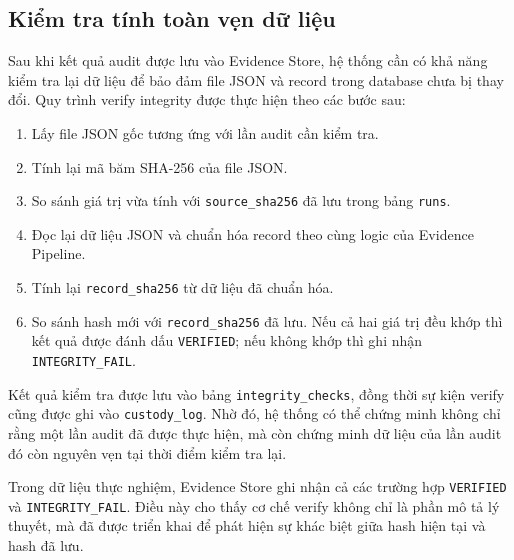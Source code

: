 \subsection{Kiểm tra tính toàn vẹn dữ liệu}\label{kiem-tra-tinh-toan-ven-du-lieu}

Sau khi kết quả audit được lưu vào Evidence Store, hệ thống cần có khả năng kiểm tra lại dữ liệu để bảo đảm file JSON và record trong database chưa bị thay đổi. Quy trình verify integrity được thực hiện theo các bước sau:

\begin{enumerate}
\item Lấy file JSON gốc tương ứng với lần audit cần kiểm tra.
\item Tính lại mã băm SHA-256 của file JSON.
\item So sánh giá trị vừa tính với \texttt{source\_sha256} đã lưu trong bảng \texttt{runs}.
\item Đọc lại dữ liệu JSON và chuẩn hóa record theo cùng logic của Evidence Pipeline.
\item Tính lại \texttt{record\_sha256} từ dữ liệu đã chuẩn hóa.
\item So sánh hash mới với \texttt{record\_sha256} đã lưu. Nếu cả hai giá trị đều khớp thì kết quả được đánh dấu \texttt{VERIFIED}; nếu không khớp thì ghi nhận \texttt{INTEGRITY\_FAIL}.
\end{enumerate}

Kết quả kiểm tra được lưu vào bảng \texttt{integrity\_checks}, đồng thời sự kiện verify cũng được ghi vào \texttt{custody\_log}. Nhờ đó, hệ thống có thể chứng minh không chỉ rằng một lần audit đã được thực hiện, mà còn chứng minh dữ liệu của lần audit đó còn nguyên vẹn tại thời điểm kiểm tra lại.

Trong dữ liệu thực nghiệm, Evidence Store ghi nhận cả các trường hợp \texttt{VERIFIED} và \texttt{INTEGRITY\_FAIL}. Điều này cho thấy cơ chế verify không chỉ là phần mô tả lý thuyết, mà đã được triển khai để phát hiện sự khác biệt giữa hash hiện tại và hash đã lưu.
